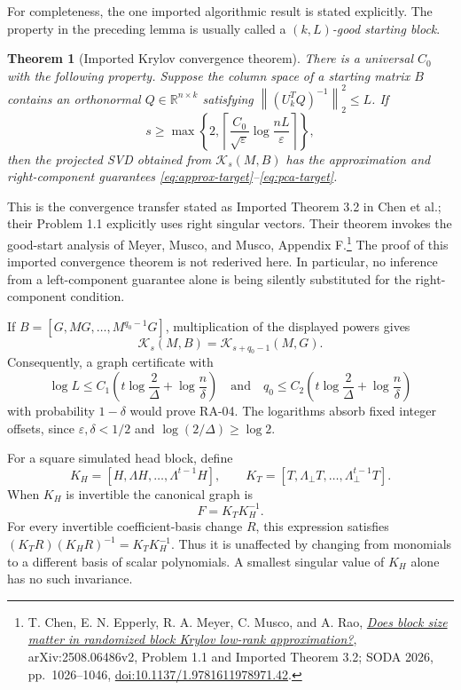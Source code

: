 \documentclass[11pt]{article}
\newtheorem{theorem}{Theorem}[section]
\theoremstyle{definition}
\newcommand{\R}{\mathbb R}
\newcommand{\K}{\mathcal K}
\newcommand{\norm}[1]{\left\lVert #1\right\rVert}
\begin{document}
For completeness, the one imported algorithmic result is stated explicitly.
The property in the preceding lemma is usually called a
\emph{$(k,L)$-good starting block}.

\begin{theorem}[Imported Krylov convergence theorem]
\label{thm:transfer}
There is a universal $C_0$ with the following property. Suppose the column
space of a starting matrix $B$ contains an orthonormal $Q\in\R^{n\times k}$ satisfying
$\norm{(U_k^TQ)^{-1}}_2^2\leq L$. If
\[
 s\geq\max\left\{2,
 \left\lceil\frac{C_0}{\sqrt\varepsilon}
       \log\frac{nL}{\varepsilon}\right\rceil\right\},
\]
then the projected SVD obtained from $\K_s(M,B)$ has the approximation and
right-component guarantees \eqref{eq:approx-target}--\eqref{eq:pca-target}.
\end{theorem}

This is the convergence transfer stated as Imported Theorem 3.2 in
Chen et al.; their Problem 1.1 explicitly uses right singular vectors.
Their theorem invokes the good-start analysis of Meyer, Musco, and Musco,
Appendix F.\footnote{T. Chen, E. N. Epperly, R. A. Meyer, C. Musco, and A. Rao,
\href{https://arxiv.org/html/2508.06486v2}{\emph{Does block size matter in randomized block Krylov low-rank approximation?}},
arXiv:2508.06486v2, Problem 1.1 and Imported Theorem 3.2;
SODA 2026, pp.~1026--1046,
\href{https://doi.org/10.1137/1.9781611978971.42}{doi:10.1137/1.9781611978971.42}.}
The proof of this imported convergence theorem is not rederived here.
In particular, no inference from a left-component guarantee alone is being
silently substituted for the right-component condition.

If $B=[G,MG,\ldots,M^{q_0-1}G]$, multiplication of the displayed powers gives
\begin{equation}
 \K_s(M,B)=\K_{s+q_0-1}(M,G).
 \label{eq:simulation}
\end{equation}
Consequently, a graph certificate with
\begin{equation}
 \log L\leq C_1\left(t\log\frac2\Delta+\log\frac n\delta\right)
 \quad\text{and}\quad
 q_0\leq C_2\left(t\log\frac2\Delta+\log\frac n\delta\right)
 \label{eq:desired-graph-size}
\end{equation}
with probability $1-\delta$ would prove RA-04. The logarithms absorb fixed
integer offsets, since $\varepsilon,\delta<1/2$ and $\log(2/\Delta)\geq\log2$.

For a square simulated head block, define
\begin{equation}
 K_H=[H,\Lambda H,\ldots,\Lambda^{t-1}H],\qquad
 K_T=[T,\Lambda_\perp T,\ldots,\Lambda_\perp^{t-1}T].
 \label{eq:khkt}
\end{equation}
When $K_H$ is invertible the canonical graph is
\begin{equation}
 F=K_TK_H^{-1}.
 \label{eq:canonical-graph}
\end{equation}
For every invertible coefficient-basis change $R$, this expression satisfies
$(K_TR)(K_HR)^{-1}=K_TK_H^{-1}$. Thus it is unaffected by changing from
monomials to a different basis of scalar polynomials. A smallest singular
value of $K_H$ alone has no such invariance.
\end{document}
